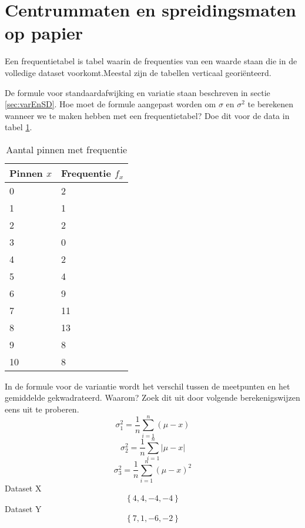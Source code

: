 \section{Centrummaten en spreidingsmaten op papier}
\begin{definition}
	Een frequentietabel is tabel waarin de frequenties van een waarde staan die in de volledige dataset voorkomt.Meestal zijn de tabellen verticaal georiënteerd.
\end{definition}

\begin{exercise}
		De formule voor standaardafwijking en variatie staan beschreven in sectie \ref{sec:varEnSD}. 
		Hoe moet de formule aangepast worden om $\sigma$ en $\sigma^{2}$ te berekenen wanneer we te
		maken hebben met een frequentietabel? Doe dit voor de data in tabel \ref{tab:pinfreq}.
\end{exercise}

	\begin{table}[]
		\centering
		\caption{Aantal pinnen met frequentie}
		\label{tab:pinfreq}
		\begin{tabular}{@{}ll@{}}
			\toprule
			Pinnen $x$ & Frequentie $f_{x}$ \\ \midrule
			0          & 2                  \\
			1          & 1                  \\
			2          & 2                  \\
			3          & 0                  \\
			4          & 2                  \\
			5          & 4                  \\
			6          & 9                  \\
			7          & 11                 \\
			8          & 13                 \\
			9          & 8                  \\ \midrule
			10         & 8                  \\ \bottomrule
		\end{tabular}
	\end{table}
	
\begin{exercise}
		In de formule voor de variantie  wordt het
		verschil tussen de meetpunten en het gemiddelde gekwadrateerd.
		Waarom? Zoek dit uit door volgende berekenigswijzen eens uit te proberen.
		\[ \sigma^{2}_{1} = \frac{1}{n} \sum_{i=1}^{n} (\mu - x) \]
		\[ \sigma^{2}_{2} = \frac{1}{n} \sum_{i=1}^{n} \left| \mu - x\right| \]
		\[ \sigma^{2}_{3} = \frac{1}{n} \sum_{i=1}^{n} (\mu - x)^{2} \]
		Dataset X \[ \left\{ 4,4,-4,-4 \right\} \]
		Dataset Y \[ \left\{ 7,1,-6,-2 \right\} \]
\end{exercise}

